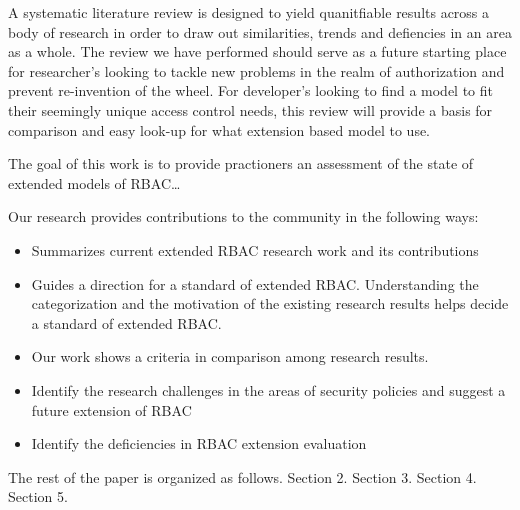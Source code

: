 A systematic literature review is designed to yield quanitfiable results across a body of research in order to draw out similarities, trends and defiencies in an area as a whole.  The review we have performed should serve as a future starting place for researcher's looking to tackle new problems in the realm of authorization and prevent re-invention of the wheel. For developer's looking to find a model to fit their seemingly unique access control needs, this review will provide a basis for comparison and easy look-up for what extension based model to use.

The goal of this work is to provide practioners an assessment of the state of extended models of RBAC\ldots

Our research provides contributions to the community in the following ways:

\begin{itemize}
\item Summarizes current extended RBAC research work and its contributions
\item Guides a direction for a standard of extended RBAC. Understanding the categorization and the motivation of the existing research results helps decide a standard of extended RBAC.
\item Our work shows a criteria in comparison among research results.
\item Identify the research challenges in the areas of security policies and suggest a future extension of RBAC
\item Identify the deficiencies in RBAC extension evaluation
\end{itemize}

The rest of the paper is organized as follows.  Section 2. Section 3. Section 4. Section 5.
